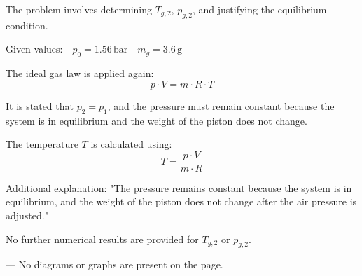 The problem involves determining \( T_{g,2} \), \( p_{g,2} \), and justifying the equilibrium condition.  

Given values:  
- \( p_0 = 1.56 \, \text{bar} \)  
- \( m_g = 3.6 \, \text{g} \)  

The ideal gas law is applied again:  
\[
p \cdot V = m \cdot R \cdot T
\]  

It is stated that \( p_2 = p_1 \), and the pressure must remain constant because the system is in equilibrium and the weight of the piston does not change.  

The temperature \( T \) is calculated using:  
\[
T = \frac{p \cdot V}{m \cdot R}
\]  

Additional explanation: "The pressure remains constant because the system is in equilibrium, and the weight of the piston does not change after the air pressure is adjusted."  

No further numerical results are provided for \( T_{g,2} \) or \( p_{g,2} \).  

---  
No diagrams or graphs are present on the page.